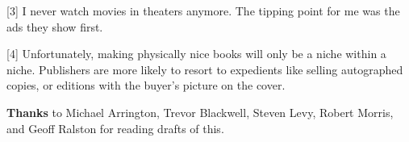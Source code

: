 {[}3{]} I never watch movies in theaters anymore. The tipping point for
me was the ads they show first.

{[}4{]} Unfortunately, making physically nice books will only be a niche
within a niche. Publishers are more likely to resort to expedients like
selling autographed copies, or editions with the buyer's picture on the
cover.

\textbf{Thanks} to Michael Arrington, Trevor Blackwell, Steven Levy,
Robert Morris, and Geoff Ralston for reading drafts of this.

